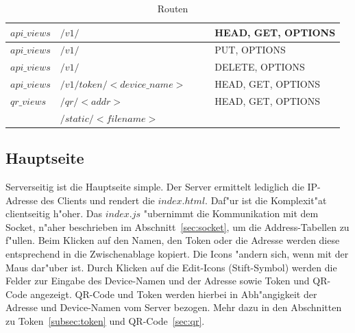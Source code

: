 \begin{table}
\begin{tabular}{|l|l|l|l|l|}
        \hline
        $api\_views$       & \tiny $/v1/$                           &                                                                                                   &                         & HEAD, GET, OPTIONS       \\
        \hline
        $api\_views$       & \tiny $/v1/$                           &                                                                                                   &                         & PUT, OPTIONS             \\
        \hline
        $api\_views$       & \tiny $/v1/$                           &                                                                                                   &                         & DELETE, OPTIONS          \\
        \hline
        $api\_views$       & \tiny $/v1/token/<device\_name>$ &                                                                                                   &                         & HEAD, GET, OPTIONS       \\
        \hline
        $qr\_views$        & \tiny $/qr/<addr>$               &                                                                                                   &                         & HEAD, GET, OPTIONS       \\
        \hline
        & \tiny $/static/<filename>$       &                                                                                                   &                         &                          \\
        \hline
    \end{tabular}
    \caption{Routen}
    \label{tab: routes}
\end{table}


\subsection{Hauptseite}\label{subsec:hauptseite}
Serverseitig ist die Hauptseite simple.
Der Server ermittelt lediglich die IP-Adresse des Clients und rendert die $index.html$.
Daf{"u}r ist die Komplexit{"a}t clientseitig h{"o}her.
Das $index.js$ {"u}bernimmt die Kommunikation mit dem Socket, n{"a}her beschrieben im Abschnitt~\ref{sec:socket}, um die Address-Tabellen zu f{"u}llen.
Beim Klicken auf den Namen, den Token oder die Adresse werden diese entsprechend in die Zwischenablage kopiert.
Die Icons {"a}ndern sich, wenn mit der Maus dar{"u}ber ist.
Durch Klicken auf die Edit-Icons (Stift-Symbol) werden die Felder zur Eingabe des Device-Namen und der Adresse sowie Token und QR-Code angezeigt.
QR-Code und Token werden hierbei in Abh{"a}ngigkeit der Adresse und Device-Namen vom Server bezogen.
Mehr dazu in den Abschnitten zu Token~\ref{subsec:token} und QR-Code~\ref{sec:qr}.

